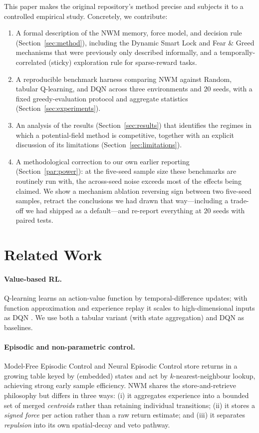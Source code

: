 \documentclass[11pt]{article}
\newcommand{\NWM}{\textsc{NWM}}
\begin{document}
This paper makes the original repository's method precise and subjects it to a
controlled empirical study. Concretely, we contribute:
\begin{enumerate}
  \item A formal description of the \NWM{} memory, force model, and decision rule
  (Section~\ref{sec:method}), including the Dynamic Smart Lock and Fear \& Greed
  mechanisms that were previously only described informally, and a
  temporally-correlated (sticky) exploration rule for sparse-reward tasks.
  \item A reproducible benchmark harness comparing \NWM{} against Random,
  tabular Q-learning, and DQN across three environments and $20$ seeds, with a
  fixed greedy-evaluation protocol and aggregate statistics
  (Section~\ref{sec:experiments}).
  \item An analysis of the results (Section~\ref{sec:results}) that identifies
  the regimes in which a potential-field method is competitive, together with an
  explicit discussion of its limitations (Section~\ref{sec:limitations}).
  \item A methodological correction to our own earlier reporting
  (Section~\ref{par:power}): at the five-seed sample size these benchmarks are
  routinely run with, the across-seed noise exceeds most of the effects being
  claimed. We show a mechanism ablation reversing sign between two five-seed
  samples, retract the conclusions we had drawn that way---including a
  trade-off we had shipped as a default---and re-report everything at $20$
  seeds with paired tests.
\end{enumerate}

\section{Related Work}
\label{sec:related}

\paragraph{Value-based RL.} Q-learning \citep{watkins1992q} learns an
action-value function by temporal-difference updates; with function
approximation and experience replay it scales to high-dimensional inputs as DQN
\citep{mnih2015human,lin1992self}. We use both a tabular variant (with state
aggregation) and DQN as baselines.

\paragraph{Episodic and non-parametric control.} Model-Free Episodic Control
\citep{blundell2016model} and Neural Episodic Control \citep{pritzel2017neural}
store returns in a growing table keyed by (embedded) states and act by
$k$-nearest-neighbour lookup, achieving strong early sample efficiency. \NWM{}
shares the store-and-retrieve philosophy but differs in three ways: (i) it
aggregates experience into a bounded set of merged \emph{centroids} rather than
retaining individual transitions; (ii) it stores a \emph{signed force} per
action rather than a raw return estimate; and (iii) it separates
\emph{repulsion} into its own spatial-decay and veto pathway.
\end{document}
